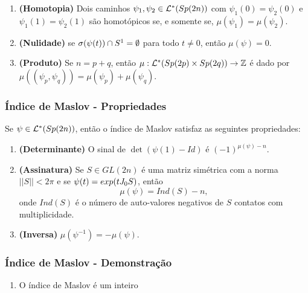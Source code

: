 \documentclass{beamer}
\begin{document}
\begin{footnotesize}
\begin{frame}
\begin{teorema}
\begin{enumerate}
				\item \textbf{(Homotopia)} \label{item_homotopia_caminhos_teorema_indice_maslov} Dois caminhos $\psi_{1}, \psi_{2}\in \mathcal{L}^{*}(Sp(2n)) $ com $\psi_{1}(0) = \psi_{2}(0)$ e $\psi_{1}(1) = \psi_{2}(1)$ são homotópicos se, e somente se, $\mu(\psi_{1}) = \mu(\psi_{2})$.
				
				\item \textbf{(Nulidade)} se $\sigma(\psi(t))\cap S^{1} = \emptyset$ para todo $t\neq 0$, então $\mu(\psi) = 0$.
				
					\item \textbf{(Produto)} Se $n=p+q$, então  $\mu:\mathcal{L}^{*}(Sp(2p)\times Sp(2q)) \to \mathbb{Z}$ é dado por $\mu((\psi_{p}, \psi_{q})) = \mu(\psi_{p})+\mu(\psi_{q})$.
			\end{enumerate}
		\end{teorema}
	\end{frame}
	
	\begin{frame}
		\frametitle{Índice de Maslov - Propriedades}
			\begin{teorema}
				Se $\psi \in \mathcal{L}^{*}(Sp(2n))$, então o índice de Maslov satisfaz as seguintes propriedades:
				\begin{enumerate}
				\item \textbf{(Determinante)} O sinal de $ \det(\psi(1)-Id)$ é $(-1)^{\mu(\psi)-n}$.
					
					\item \textbf{(Assinatura)}\label{item_assinatura_maslov} Se $S \in GL(2n)$ é uma matriz simétrica com a norma $||S|| < 2\pi$ e se $\psi(t) = exp(tJ_{0} S)$, então 
					$$
					\mu(\psi) = Ind(S) - n,
					$$
					onde $Ind(S)$ é o número de auto-valores negativos de $S$ contatos com multiplicidade.
					
					\item \textbf{(Inversa)} $\mu(\psi^{-1}) = -\mu(\psi)$.
					
				\end{enumerate}
			\end{teorema}
	\end{frame}
	
	
	\begin{frame}
		\frametitle{Índice de Maslov - Demonstração}
		\begin{prova}
			\begin{enumerate}
				\item  O índice de Maslov é um inteiro
				

\end{enumerate}
\end{prova}
\end{frame}
\end{footnotesize}
\end{document}
